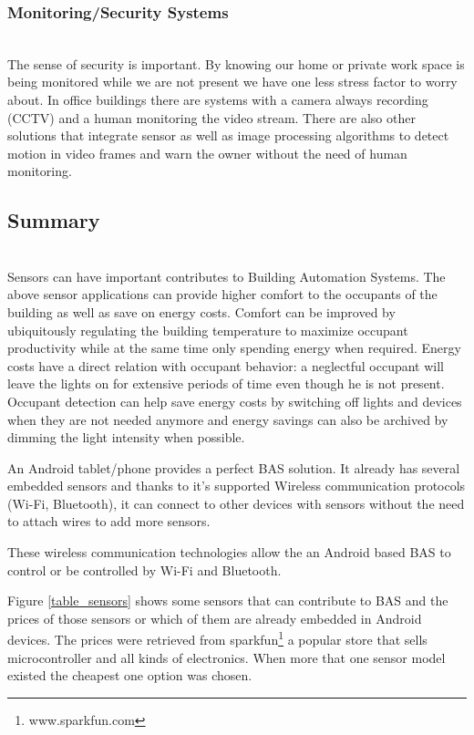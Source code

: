 \subsubsection{Monitoring/Security Systems}\mbox{}\\

The sense of security is important. By knowing our home or private work space is being monitored while we are not present we have one less stress factor to worry about.
In office buildings there are systems with a camera always recording (CCTV)\cite{livro_automation2} and a human monitoring the video stream. There are also other solutions that integrate sensor as well as image processing algorithms\cite{video_survailance1} to detect motion in video frames and warn the owner without the need of human monitoring. 




\subsection{Summary}\mbox{}\\

Sensors can have important contributes to Building Automation Systems. The above sensor applications can provide higher comfort to the occupants of the building as well as save on energy costs. Comfort can be improved by ubiquitously regulating the building temperature to maximize occupant productivity while at the same time only spending energy when required. Energy costs have a direct relation with occupant behavior: a neglectful occupant will leave the lights on for extensive periods of time even though he is not present. Occupant detection can help save energy costs by switching off lights and devices when they are not needed anymore and energy savings can also be archived by dimming the light intensity when possible. 

An Android tablet/phone provides a perfect BAS solution. It already has several embedded sensors  and thanks to it's supported Wireless communication protocols (Wi-Fi, Bluetooth), it can connect to other devices with sensors without the need to attach wires to add more sensors. 

These wireless communication technologies allow the an Android based BAS to control or be controlled by Wi-Fi and Bluetooth.

Figure \ref{table_sensors} shows some sensors that can contribute to BAS and the prices of those sensors or which of them are already embedded in Android devices. The prices were retrieved from sparkfun\footnote{www.sparkfun.com} a popular store that sells microcontroller and all kinds of electronics. When more that one sensor model existed the cheapest one option was chosen.

